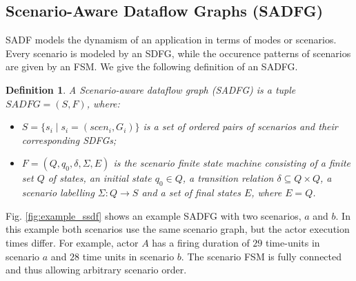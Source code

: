 \documentclass[]{eptcs}
\newtheorem{mydef}{Definition}
\begin{document}
\subsection{Scenario-Aware Dataflow Graphs (SADFG)}
SADF models the dynamism of an application in terms of modes or scenarios. Every scenario is modeled by an SDFG, while the occurence patterns of scenarios are given by an FSM. We give the following definition of an SADFG.
\begin{mydef}
A Scenario-aware dataflow graph (SADFG) is a tuple \\ $\mathit{SADFG}=(S, F)$, where:
\begin{itemize}
\item $S=\{s_i \; | \; s_i= (\mathit{scen}_i,G_i)\}$ is a set of ordered pairs of scenarios and their corresponding SDFGs;
\item $F=(Q,q_0, \delta, \Sigma, E)$ is the scenario finite state machine consisting of a finite set $Q$ of states, an initial state $q_0 \in Q$, a transition relation $\delta \subseteq Q \times Q$, a scenario labelling $\Sigma:  Q \rightarrow S$ and a set of final states $E$, where $E=Q$.
\end{itemize}
\end{mydef}
Fig. \ref{fig:example_ssdf} shows an example SADFG with two scenarios, $a$ and $b$. In this example both scenarios use the same scenario graph, but the actor execution times differ. For example, actor $A$ has a firing duration of $29$ time-units in scenario $a$ and $28$ time units in scenario $b$. The scenario FSM is fully connected and thus allowing arbitrary scenario order.
\end{document}
